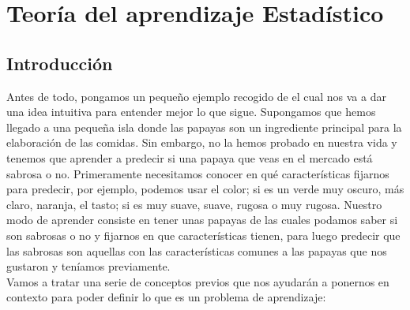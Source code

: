 \chapter{Teoría del aprendizaje Estadístico}\label{ch:AprendizajeEstadistico}


    
    \newpage 
    \section{Introducción}
    
    Antes de todo, pongamos un pequeño ejemplo recogido de \cite{UML} el cual nos va a dar una idea intuitiva para entender mejor lo que sigue. Supongamos que hemos llegado a una pequeña isla donde las papayas son un ingrediente principal para la elaboración de las comidas. Sin embargo, no la hemos probado en nuestra vida y tenemos que aprender a predecir si una papaya que veas en el mercado está sabrosa o no. Primeramente necesitamos conocer en qué características fijarnos para predecir, por ejemplo, podemos usar el color; si es un verde muy oscuro, más claro, naranja, el tasto; si es muy suave, suave, rugosa o muy rugosa. Nuestro modo de aprender consiste en tener unas papayas de las cuales podamos saber si son sabrosas o no y fijarnos en que características tienen, para luego predecir que las sabrosas son aquellas con las características comunes a las papayas que nos gustaron y teníamos previamente. \\
    
    Vamos a tratar una serie de conceptos previos que nos ayudarán a ponernos en contexto para poder definir lo que es un problema de aprendizaje:
    
